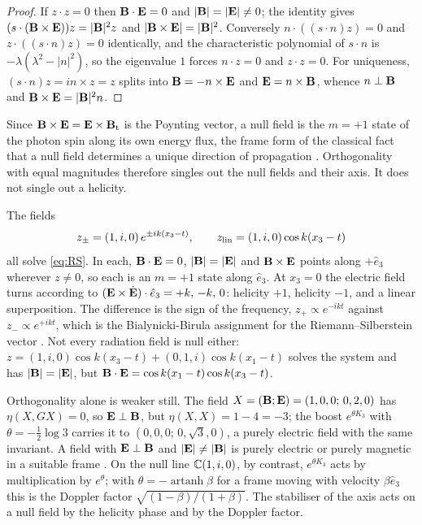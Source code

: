 \begin{proof}
If $z\cdot z=0$ then $\mathbf B\cdot\mathbf E=0$ and $|\mathbf B|=|\mathbf E|\neq0$; the identity gives $(s\cdot(\mathbf B\times\mathbf E))z=|\mathbf B|^2z$ and
$|\mathbf B\times\mathbf E|=|\mathbf B|^2$. Conversely $n\cdot((s\cdot n)z)=0$ and $z\cdot((s\cdot n)z)=0$ identically, and the characteristic polynomial
of $s\cdot n$ is $-\lambda(\lambda^2-|n|^2)$, so the eigenvalue $1$ forces $n\cdot z=0$ and $z\cdot z=0$. For uniqueness,
$(s\cdot n)z=in\times z=z$ splits into $\mathbf B=-n\times\mathbf E$ and $\mathbf E=n\times\mathbf B$, whence $n\perp\mathbf B$ and $\mathbf B\times\mathbf E=|\mathbf B|^2n$.
\end{proof}

Since $\mathbf B\times\mathbf E=\mathbf E\times\mathbf B_{\rm t}$ is the Poynting vector, a null field is the $m=+1$ state of the photon spin along its own energy
flux, the frame form of the classical fact that a null field determines a unique direction of propagation
\cite{Synge56,Robinson61}. Orthogonality with equal magnitudes therefore singles out the null fields and their axis. It does not
single out a helicity.

\begin{example}
\label{ex:threewaves}
The fields
\[
z_\pm=(1,i,0)\,e^{\pm ik(x_3-t)},\qquad z_{\rm lin}=(1,i,0)\cos k(x_3-t)
\]
all solve \eqref{eq:RS}. In each, $\mathbf B\cdot\mathbf E=0$, $|\mathbf B|=|\mathbf E|$ and $\mathbf B\times\mathbf E$ points along $+\hat e_3$ wherever $z\neq0$, so each is an
$m=+1$ state along $\hat e_3$. At $x_3=0$ the electric field turns according to $(\mathbf E\times\dot{\mathbf E})\cdot\hat e_3=+k,\,-k,\,0$: helicity
$+1$, helicity $-1$, and a linear superposition. The difference is the sign of the frequency, $z_+\propto e^{-ikt}$ against
$z_-\propto e^{+ikt}$, which is the Bialynicki-Birula assignment for the Riemann--Silberstein vector \cite{BialynickiBirula96}. Not every
radiation field is null either: $z=(1,i,0)\cos k(x_3-t)+(0,1,i)\cos k(x_1-t)$ solves the system and has $|\mathbf B|=|\mathbf E|$, but
$\mathbf B\cdot\mathbf E=\cos k(x_1-t)\cos k(x_3-t)$.
\end{example}

Orthogonality alone is weaker still. The field $X=(\mathbf B;\mathbf E)=(1,0,0;\,0,2,0)$ has $\eta(X,GX)=0$, so $\mathbf E\perp\mathbf B$, but
$\eta(X,X)=1-4=-3$; the boost $e^{\theta K_3}$ with $\theta=-\tfrac12\log3$ carries it to $(0,0,0;\,0,\sqrt3,0)$, a purely electric field
with the same invariant. A field with $\mathbf E\perp\mathbf B$ and $|\mathbf E|\neq|\mathbf B|$ is purely electric or purely magnetic in a suitable frame
\cite{LandauLifshitz2}. On the null line $\mathbb{C}(1,i,0)$, by contrast, $e^{\theta K_3}$ acts by multiplication by $e^\theta$; with
$\theta=-\operatorname{artanh}\beta$ for a frame moving with velocity $\beta\hat e_3$ this is the Doppler factor $\sqrt{(1-\beta)/(1+\beta)}$.
The stabiliser of the axis acts on a null field by the helicity phase and by the Doppler factor.

